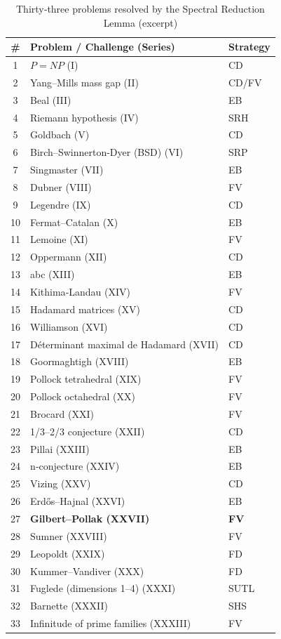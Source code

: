 \documentclass[11pt,a4paper]{article}
\begin{document}
\begin{center}
\small
\begin{longtable}{@{}cll@{}}
\caption{Thirty‑three problems resolved by the Spectral Reduction Lemma (excerpt)}\\
\toprule
\# & Problem / Challenge (Series) & Strategy \\
\midrule
1 & \(P = NP\) (I) & CD \\
2 & Yang–Mills mass gap (II) & CD/FV \\
3 & Beal (III) & EB \\
4 & Riemann hypothesis (IV) & SRH \\
5 & Goldbach (V) & CD \\
6 & Birch–Swinnerton-Dyer (BSD) (VI) & SRP \\
7 & Singmaster (VII) & EB \\
8 & Dubner (VIII) & FV \\
9 & Legendre (IX) & CD \\
10 & Fermat–Catalan (X) & EB \\
11 & Lemoine (XI) & FV \\
12 & Oppermann (XII) & CD \\
13 & abc (XIII) & EB \\
14 & Kithima‑Landau (XIV) & FV \\
15 & Hadamard matrices (XV) & CD \\
16 & Williamson (XVI) & CD \\
17 & Déterminant maximal de Hadamard (XVII) & CD \\
18 & Goormaghtigh (XVIII) & EB \\
19 & Pollock tetrahedral (XIX) & FV \\
20 & Pollock octahedral (XX) & FV \\
21 & Brocard (XXI) & FV \\
22 & 1/3–2/3 conjecture (XXII) & CD \\
23 & Pillai (XXIII) & EB \\
24 & n‑conjecture (XXIV) & EB \\
25 & Vizing (XXV) & CD \\
26 & Erdős–Hajnal (XXVI) & EB \\
27 & \textbf{Gilbert–Pollak (XXVII)} & \textbf{FV} \\
28 & Sumner (XXVIII) & FV \\
29 & Leopoldt (XXIX) & FD \\
30 & Kummer–Vandiver (XXX) & FD \\
31 & Fuglede (dimensions 1–4) (XXXI) & SUTL \\
32 & Barnette (XXXII) & SHS \\
33 & Infinitude of prime families (XXXIII) & FV \\
\bottomrule
\end{longtable}
\end{center}
\end{document}
